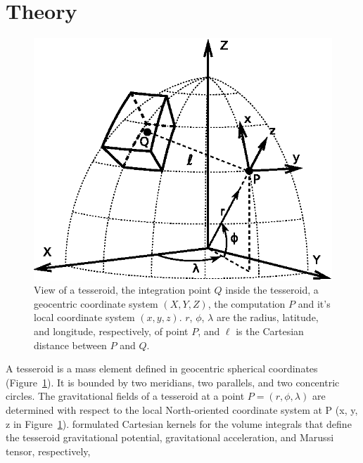 \section{Theory}


\begin{figure}
    \centering
    \includegraphics{figures/paper-tesseroids/tesseroid}
    \caption{
        View of a tesseroid,
        the integration point $Q$ inside the tesseroid,
        a geocentric coordinate system $(X, Y, Z)$,
        the computation $P$ and it's local coordinate system $(x, y, z)$.
        $r$, $\phi$, $\lambda$ are
        the radius, latitude, and longitude, respectively, of point $P$,
        and $\ell$ is the Cartesian distance between $P$ and $Q$.
    }
    \label{fig:p2-tesseroid}
\end{figure}

A tesseroid is a mass element defined in geocentric spherical
coordinates
(Figure~\ref{fig:p2-tesseroid}).
It is bounded by two meridians, two parallels, and two concentric circles.
The gravitational fields of a tesseroid at a point $P = (r,\phi,\lambda)$
are determined with respect to the local North-oriented coordinate system at
P (x, y, z in Figure~\ref{fig:p2-tesseroid}).
\citet{grombein2013} formulated Cartesian kernels for the volume integrals
that define the tesseroid gravitational potential, gravitational acceleration,
and Marussi tensor, respectively,

